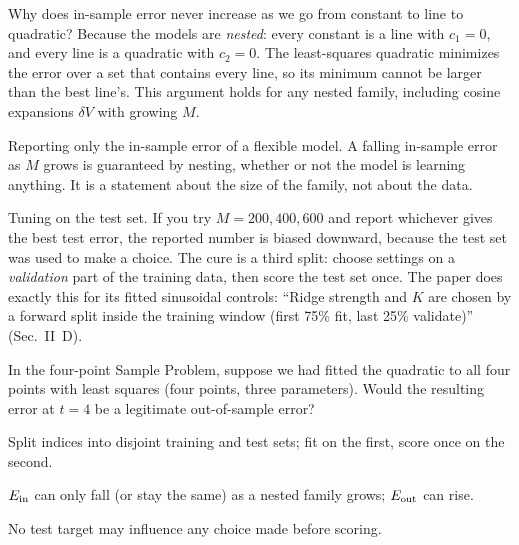 Why does in-sample error never increase as we go from constant to line to quadratic? Because the models are \emph{nested}: every constant is a line with $c_1=0$, and every line is a quadratic with $c_2=0$. The least-squares quadratic minimizes the error over a set that contains every line, so its minimum cannot be larger than the best line's. This argument holds for any nested family, including cosine expansions $\delta V$ with growing $M$.

\begin{pitfall}
Reporting only the in-sample error of a flexible model. A falling in-sample error as $M$ grows is guaranteed by nesting, whether or not the model is learning anything. It is a statement about the size of the family, not about the data.
\end{pitfall}

\begin{pitfall}
Tuning on the test set. If you try $M=200,400,600$ and report whichever gives the best test error, the reported number is biased downward, because the test set was used to make a choice. The cure is a third split: choose settings on a \emph{validation} part of the training data, then score the test set once. The paper does exactly this for its fitted sinusoidal controls: ``Ridge strength and $K$ are chosen by a forward split inside the training window (first 75\% fit, last 25\% validate)'' (Sec.~II~D).
\end{pitfall}

\begin{checkpoint}
In the four-point Sample Problem, suppose we had fitted the quadratic to all four points with least squares (four points, three parameters). Would the resulting error at $t=4$ be a legitimate out-of-sample error?
\end{checkpoint}

\begin{keyideas}
\item Split indices into disjoint training and test sets; fit on the first, score once on the second.
\item $E_{\rm in}$ can only fall (or stay the same) as a nested family grows; $E_{\rm out}$ can rise.
\item No test target may influence any choice made before scoring.
\end{keyideas}

